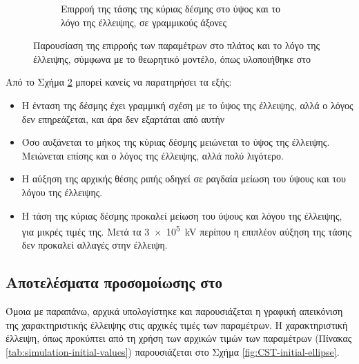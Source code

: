 \begin{figure}[tph]
\begin{subfigure}{0.47\textwidth}
		\centering
		\caption{Επιρροή της τάσης της κύριας δέσμης στο ύψος και το λόγο της έλλειψης, σε γραμμικούς άξονες}
		\label{fig:EBS-variables-voltage-linear}
	\end{subfigure}
\caption{Παρουσίαση της επιρροής των παραμέτρων στο πλάτος και το λόγο της έλλειψης, σύμφωνα με το θεωρητικό μοντέλο, όπως υλοποιήθηκε στο }	
\label{fig:EBS-MATLAB-variables}
\end{figure}

Από το Σχήμα \ref{fig:EBS-MATLAB-variables} μπορεί κανείς να παρατηρήσει τα εξής:
\begin{itemize}
\item Η ένταση της δέσμης έχει γραμμική σχέση με το ύψος της έλλειψης, αλλά ο λόγος δεν επηρεάζεται, και άρα δεν εξαρτάται από αυτήν
\item Όσο αυξάνεται το μήκος της κύριας δέσμης μειώνεται το ύψος της έλλειψης.
Μειώνεται επίσης και ο λόγος της έλλειψης, αλλά πολύ λιγότερο.
\item Η αύξηση της αρχικής θέσης ριπής οδηγεί σε ραγδαία μείωση του ύψους και του λόγου της έλλειψης.
\item Η τάση της κύριας δέσμης προκαλεί μείωση του ύψους και λόγου της έλλειψης, για μικρές τιμές της. 
Μετά τα \SI{3e5}{\kilo \volt} περίπου η επιπλέον αύξηση της τάσης δεν προκαλεί αλλαγές στην έλλειψη.
\end{itemize}


\subsection{Αποτελέσματα προσομοίωσης στο }

Όμοια με παραπάνω, αρχικά υπολογίστηκε και παρουσιάζεται η γραφική απεικόνιση της χαρακτηριστικής έλλειψης στις αρχικές τιμές των παραμέτρων.
Η χαρακτηριστική έλλειψη, όπως προκύπτει από τη χρήση των αρχικών τιμών των παραμέτρων (Πίνακας \ref{tab:simulation-initial-values}) παρουσιάζεται στο Σχήμα \ref{fig:CST-initial-ellipse}.

